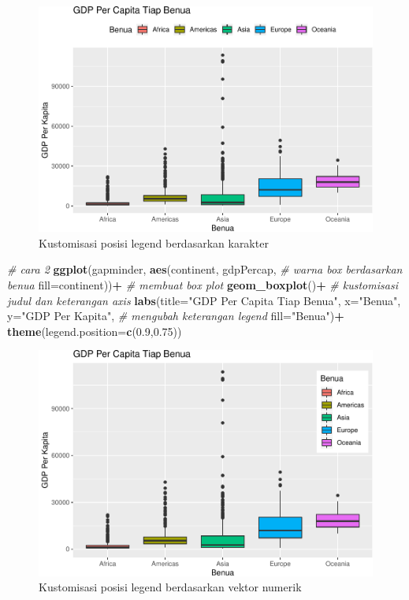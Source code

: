 \documentclass[]{book}
\newenvironment{Shaded}{\begin{snugshade}}{\end{snugshade}}
\newcommand{\KeywordTok}[1]{\textcolor[rgb]{0.13,0.29,0.53}{\textbf{#1}}}
\newcommand{\DataTypeTok}[1]{\textcolor[rgb]{0.13,0.29,0.53}{#1}}
\newcommand{\FloatTok}[1]{\textcolor[rgb]{0.00,0.00,0.81}{#1}}
\newcommand{\StringTok}[1]{\textcolor[rgb]{0.31,0.60,0.02}{#1}}
\newcommand{\CommentTok}[1]{\textcolor[rgb]{0.56,0.35,0.01}{\textit{#1}}}
\newcommand{\OperatorTok}[1]{\textcolor[rgb]{0.81,0.36,0.00}{\textbf{#1}}}
\newcommand{\NormalTok}[1]{#1}
\begin{document}
\begin{figure}

{\centering \includegraphics[width=0.7\linewidth]{EnvStat_files/figure-latex/gglegend-1} 

}

\caption{Kustomisasi posisi legend berdasarkan karakter}\label{fig:gglegend}
\end{figure}

\begin{Shaded}
\begin{Highlighting}[]
\CommentTok{# cara 2}
\KeywordTok{ggplot}\NormalTok{(gapminder, }\KeywordTok{aes}\NormalTok{(continent, gdpPercap, }
                      \CommentTok{# warna box berdasarkan benua}
                      \DataTypeTok{fill=}\NormalTok{continent))}\OperatorTok{+}
\StringTok{  }\CommentTok{# membuat box plot}
\StringTok{  }\KeywordTok{geom_boxplot}\NormalTok{()}\OperatorTok{+}
\StringTok{  }\CommentTok{# kustomisasi judul dan keterangan axis}
\StringTok{  }\KeywordTok{labs}\NormalTok{(}\DataTypeTok{title=}\StringTok{"GDP Per Capita Tiap Benua"}\NormalTok{,}
       \DataTypeTok{x=}\StringTok{"Benua"}\NormalTok{, }\DataTypeTok{y=}\StringTok{"GDP Per Kapita"}\NormalTok{,}
       \CommentTok{# mengubah keterangan legend}
       \DataTypeTok{fill=}\StringTok{"Benua"}\NormalTok{)}\OperatorTok{+}
\StringTok{  }\KeywordTok{theme}\NormalTok{(}\DataTypeTok{legend.position=}\KeywordTok{c}\NormalTok{(}\FloatTok{0.9}\NormalTok{,}\FloatTok{0.75}\NormalTok{))}
\end{Highlighting}
\end{Shaded}

\begin{figure}

{\centering \includegraphics[width=0.7\linewidth]{EnvStat_files/figure-latex/gglegend2-1} 

}

\caption{Kustomisasi posisi legend berdasarkan vektor numerik}\label{fig:gglegend2}
\end{figure}
\end{document}
